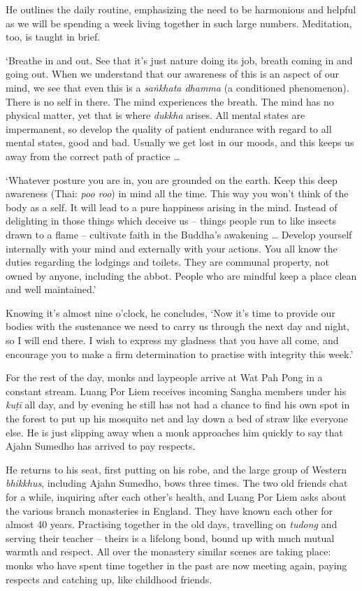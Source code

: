 He outlines the daily routine, emphasizing the need to be harmonious and
helpful as we will be spending a week living together in such large
numbers. Meditation, too, is taught in brief.

`Breathe in and out. See that it's just nature doing its job, breath
coming in and going out. When we understand that our awareness of this
is an aspect of our mind, we see that even this is a
\emph{saṅkhata dhamma} (a conditioned phenomenon). There is no self in
there. The mind experiences the breath. The mind has no physical matter, 
yet that is where \emph{dukkha} arises. All mental states are
impermanent, so develop the quality of patient endurance with regard to
all mental states, good and bad. Usually we get lost in our moods, and
this keeps us away from the correct path of practice \ldots{}

`Whatever posture you are in, you are grounded on the earth. Keep this
deep awareness (Thai: \emph{poo roo}) in mind all the time. This way you
won't think of the body as a self. It will lead to a pure happiness
arising in the mind. Instead of delighting in those things which deceive
us -- things people run to like insects drawn to a flame -- cultivate
faith in the Buddha's awakening \ldots{} Develop yourself internally
with your mind and externally with your actions. You all know the duties
regarding the lodgings and toilets. They are communal property, not
owned by anyone, including the abbot. People who are mindful keep a
place clean and well maintained.'

Knowing it's almost nine o'clock, he concludes, `Now it's time to
provide our bodies with the sustenance we need to carry us through the
next day and night, so I will end there. I wish to express my gladness
that you have all come, and encourage you to make a firm determination
to practise with integrity this week.'

For the rest of the day, monks and laypeople arrive at Wat Pah Pong in a
constant stream. Luang Por Liem receives incoming Sangha members under
his \emph{kuṭī} all day, and by evening he still has not had a chance to
find his own spot in the forest to put up his mosquito net and lay down
a bed of straw like everyone else. He is just slipping away when a monk
approaches him quickly to say that Ajahn Sumedho has arrived to pay
respects.

He returns to his seat, first putting on his robe, and the large group
of Western \emph{bhikkhus}, including Ajahn Sumedho, bows three times. 
The two old friends chat for a while, inquiring after each other's
health, and Luang Por Liem asks about the various branch monasteries in
England. They have known each other for almost 40 years. Practising
together in the old days, travelling on \emph{tudong} and serving their
teacher -- theirs is a lifelong bond, bound up with much mutual warmth
and respect. All over the monastery similar scenes are taking place: 
monks who have spent time together in the past are now meeting again, 
paying respects and catching up, like childhood friends. 

